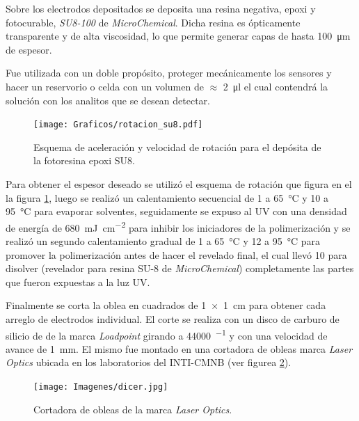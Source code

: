 		Sobre los electrodos depositados se deposita una resina negativa, epoxi y fotocurable, \textit{SU8-100} de \textit{MicroChemical}\cite{MicrochemicalsTeam2009}. Dicha resina es ópticamente transparente y de alta viscosidad, lo que permite generar capas de hasta \SI{100}{\um} de espesor. 

		Fue utilizada con un doble propósito, proteger mecánicamente los sensores y hacer un reservorio o celda con un volumen de $\approx$ \SI{2}{\ul} el cual contendrá la solución con los analitos que se desean detectar.  
			\begin{figure}[ht]
			 		  \begin{center}
			 		  \texttt{[image: Graficos/rotacion\_su8.pdf]}
			 		  \caption[Parámetros de depósito para la resina epoxi]{Esquema de aceleración y velocidad de rotación para el depósita de la fotoresina epoxi SU8.}
			 		  \label{fig:spin-su8}
			 		  \end{center}
			 		  \end{figure}
	
		Para obtener el espesor deseado se utilizó el esquema de rotación que figura en el la figura \ref{fig:spin-su8}, luego se realizó un calentamiento secuencial de \SI{1}{\min} a \SI{65}{\celsius} y \SI{10}{\min} a \SI{95}{\celsius} para evaporar solventes, seguidamente se expuso al UV con una densidad de energía de \SI{680}{mJ.cm^{-2}} para inhibir los iniciadores de la polimerización y se realizó un segundo calentamiento gradual de \SI{1}{\min} a \SI{65}{\celsius} y \SI{12}{\min} a \SI{95}{\celsius} para promover la polimerización antes de hacer el revelado final, el cual llevó \SI{10}{\min} para disolver (revelador para resina SU-8 de \textit{MicroChemical}) completamente las partes que fueron expuestas a la luz UV. 
		
		Finalmente se corta la oblea en cuadrados de \SI{1x1}{\cm} para obtener cada arreglo de electrodos individual. El corte se realiza con un disco de carburo de silicio de  de la marca \textit{Loadpoint} girando a \SI{44000}{\min^{-1}} y con una velocidad de avance de \SI{1}{\mm}. El mismo fue montado en una cortadora de obleas marca \textit{Laser Optics} ubicada en los laboratorios del INTI-CMNB (ver figurea \ref{fig:dicer}).
			\begin{figure}[ht]
			 		  \begin{center}
			 		  \texttt{[image: Imagenes/dicer.jpg]}
			 		  \caption[Cortadora de obleas]{Cortadora de obleas de la marca \textit{Laser Optics}.}
			 		  \label{fig:dicer}
			 		  \end{center}
			 		  \end{figure}
			

